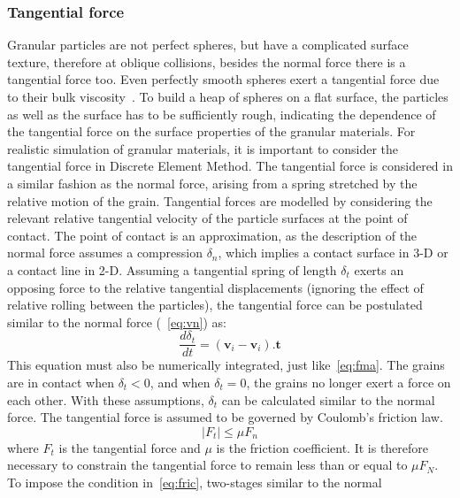 \subsubsection*{Tangential force}
Granular particles are not perfect spheres, but have a complicated surface 
texture, therefore at 
oblique collisions, besides the normal force there is a tangential force too. 
Even perfectly 
smooth 
spheres exert a tangential force due to their bulk viscosity~\citep{Posch2005}. 
To build a heap of 
spheres on a flat surface, the particles as well as the surface has to be 
sufficiently rough, 
indicating the dependence of the tangential force on the surface properties of 
the granular 
materials. For realistic simulation of granular materials, it is important to 
consider the 
tangential force in Discrete Element Method. The tangential force is considered 
in a similar 
fashion as the normal force, arising from a spring stretched by the relative 
motion of the grain. 
Tangential forces are modelled by considering the relevant relative tangential 
velocity of the 
particle surfaces at the point of contact. The point of contact is an 
approximation, as the 
description of the normal force assumes a compression $\delta_{n}$, which 
implies a contact 
surface 
in 3-D or a contact line in 2-D. Assuming a tangential spring of length 
$\delta_{t}$ exerts an 
opposing force to the relative tangential displacements (ignoring the effect of 
relative rolling 
between the particles), the tangential force can be postulated similar to the 
normal force 
(~\cref{eq:vn}) as:
\begin{equation}
\label{eq:vt}
\frac{d{\delta_{t}}}{dt}=(\mathbf{v}_{\mathit{i}}-\mathbf{v}_{\mathit{i}}).{\mathbf{t}}
\end{equation}
This equation must also be numerically integrated, just like~\cref{eq:fma}. The 
grains are in 
contact when $\delta_{t}<0$, and when $\delta_{t}=0$, the grains no longer 
exert a force on each 
other. With these assumptions, $\delta_{t}$ can be calculated similar to the 
normal force. The 
tangential force is assumed to be governed by Coulomb's friction law.
\begin{equation}
\left|F_{\mathit{t}}\right|\le\mu F_{\mathit{n}} \label{eq:fric}
\end{equation}
where $F_{\mathit{t}}$ is the tangential force and $\mu$ is the friction 
coefficient. It is 
therefore necessary to constrain the tangential force to remain less than or 
equal to $\mu F_{N}$. 
To impose the condition in~\cref{eq:fric}, two-stages similar to the normal 
